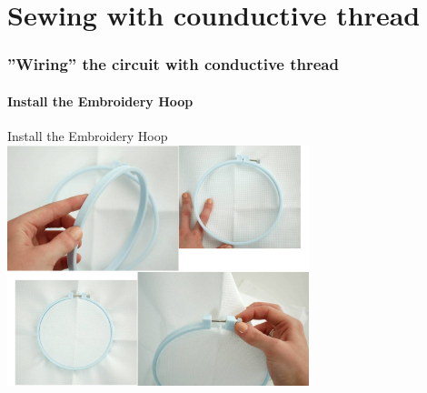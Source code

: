 \documentclass[aspectratio=169]{beamer}
\begin{document}
\part{Sewing with counductive thread}
\section{''Wiring'' the circuit with conductive thread}
\frame{\tableofcontents[hideothersubsections,sectionstyle=show/hide]}
\subsection{Install the Embroidery Hoop}
\begin{frame}[fragile]{Install the Embroidery Hoop}
\includegraphics[height=2.75in]{InstallEmbroideryHoop.jpg}
\end{frame} 
\end{document}
